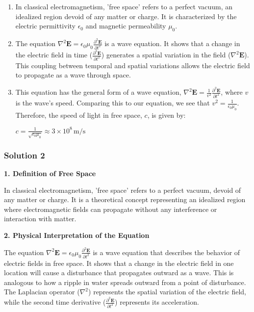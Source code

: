 \documentclass{article}
\begin{document}
\begin{enumerate}
\item In classical electromagnetism, 'free space' refers to a perfect vacuum,  an idealized region devoid of any matter or charge. It is characterized by the electric permittivity $\epsilon_0$ and magnetic permeability $\mu_0$. 

\item The equation $\nabla^2 \mathbf{E} = \epsilon_0 \mu_0 \frac{\partial^2 \mathbf{E}}{\partial t^2}$ is a wave equation. It shows that a change in the electric field in time ($\frac{\partial^2 \mathbf{E}}{\partial t^2}$) generates a spatial variation in the field ($\nabla^2 \mathbf{E}$). This coupling between temporal and spatial variations allows the electric field to propagate as a wave through space. 

\item  This equation has the general form of a wave equation, $\nabla^2 \mathbf{E} = \frac{1}{v^2} \frac{\partial^2 \mathbf{E}}{\partial t^2}$, where $v$ is the wave's speed.  Comparing this to our equation, we see that $v^2 = \frac{1}{\epsilon_0 \mu_0}$.  Therefore, the speed of light in free space, $c$, is given by:

$c = \frac{1}{\sqrt{\epsilon_0 \mu_0}} \approx 3 \times 10^8 \, \text{m/s}$ 
\end{enumerate}


\subsubsection{Solution 2}
\textbf{1. Definition of Free Space}

In classical electromagnetism, 'free space' refers to a perfect vacuum, devoid of any matter or charge. It is a theoretical concept representing an idealized region where electromagnetic fields can propagate without any interference or interaction with matter.

\textbf{2. Physical Interpretation of the Equation}

The equation $\nabla^2 \mathbf{E} = \epsilon_0 \mu_0 \frac{\partial^2 \mathbf{E}}{\partial t^2}$ is a wave equation that describes the behavior of electric fields in free space. It shows that a change in the electric field in one location will cause a disturbance that propagates outward as a wave. This is analogous to how a ripple in water spreads outward from a point of disturbance. The Laplacian operator ($\nabla^2$) represents the spatial variation of the electric field, while the second time derivative ($\frac{\partial^2 \mathbf{E}}{\partial t^2}$) represents its acceleration.
\end{document}
